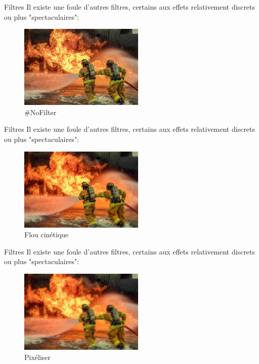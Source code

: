 \documentclass[10pt,svgnames,usenames,table]{beamer}
\begin{document}
\begin{frame}{Filtres}
		Il existe une foule d'autres filtres, certains aux effets relativement discrets ou plus "spectaculaires":
		
		\begin{figure}[H]
			\centering
				\includegraphics[height=150px]{Images/filters/compressed_original} 
				\caption{\#NoFilter}
			\end{figure}		
	\end{frame}

	\begin{frame}{Filtres}
		Il existe une foule d'autres filtres, certains aux effets relativement discrets ou plus "spectaculaires":
		
		\begin{figure}[H]
			\centering
				\includegraphics[height=150px]{Images/filters/motion_blur} 
				\caption{Flou cinétique}
			\end{figure}		
	\end{frame}

\begin{frame}{Filtres}
		Il existe une foule d'autres filtres, certains aux effets relativement discrets ou plus "spectaculaires":
		
		\begin{figure}[H]
			\centering	
				\includegraphics[height=150px]{Images/filters/pixelize} 
				\caption{Pixéliser}
			\end{figure}		
	\end{frame}
\end{document}
